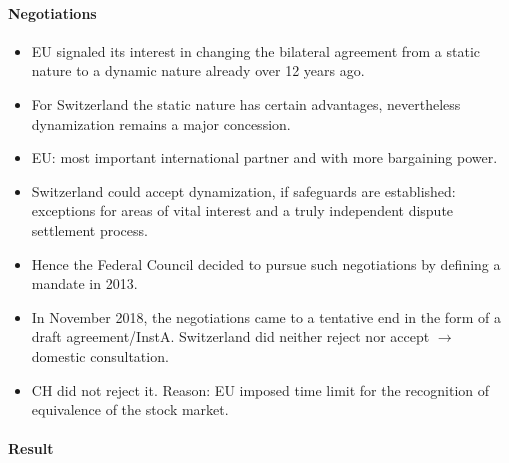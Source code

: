\paragraph{Negotiations}

\begin{itemize}
    \item EU signaled its interest in changing the bilateral agreement from
        a static nature to a dynamic nature already over 12 years ago.
    \item For Switzerland the static nature has certain advantages, nevertheless
        dynamization remains a major concession.
    \item EU: most important international partner and with more bargaining power.
    \item Switzerland could accept dynamization, if safeguards are established:
        exceptions for areas of vital interest and a truly independent dispute
        settlement process.
    \item Hence the Federal Council decided to pursue such negotiations by
        defining a mandate in 2013.
    \item In November 2018, the negotiations came to a tentative end in the
        form of a draft agreement/InstA. Switzerland did neither reject nor
        accept $\rightarrow$ domestic consultation.
    \item CH did not reject it. Reason: EU imposed time limit for the
        recognition of equivalence of the stock market.
\end{itemize}

\paragraph{Result}

